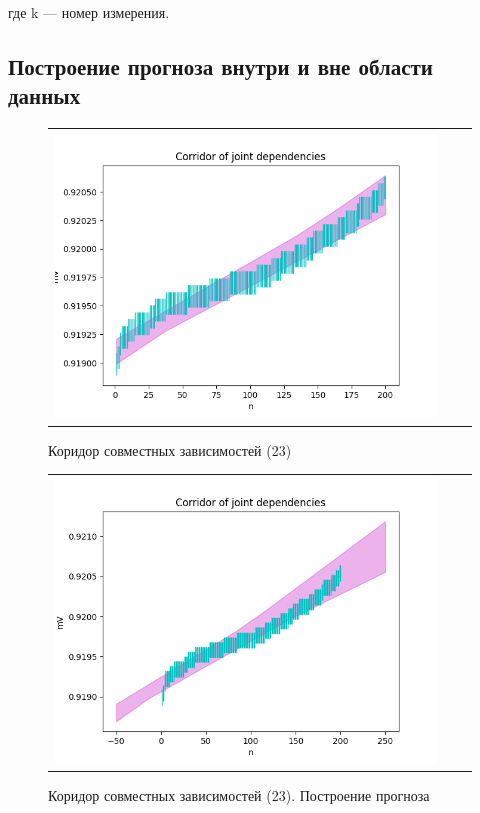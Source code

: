 \documentclass[a4paper,14pt]{article}
\begin{document}
	где k — номер измерения.
	
	\subsection{Построение прогноза внутри и вне области данных}
	\begin{figure}[H]
		\begin{center}
			\begin{tabular}{ccc}
				\includegraphics[scale=0.8]{../image/intervals1.png}
			\end{tabular}
		\end{center}
		\caption{Коридор совместных зависимостей (23)} 
	\end{figure}

	\begin{figure}[H]
		\begin{center}
			\begin{tabular}{ccc}
				\includegraphics[scale=0.8]{../image/intervals2.png}
			\end{tabular}
		\end{center}
		\caption{Коридор совместных зависимостей (23). Построение прогноза} 
	\end{figure}
\end{document}
